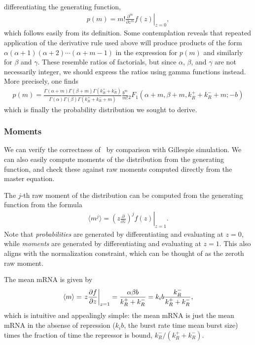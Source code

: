 differentiating the generating function,
\begin{align}
p(m) = m! \left.\frac{\partial^m}{\partial z^m} f(z) \right|_{z=0},
\end{align}
which follows easily from its definition. Some contemplation reveals
that repeated application of the derivative rule used above will produce
products of the form $\alpha(\alpha+1)(\alpha+2)\cdots(\alpha+m-1)$ in
the expression for $p(m)$ and similarly for $\beta$ and $\gamma$. These
resemble ratios of factorials, but since $\alpha$, $\beta$, and $\gamma$
are not necessarily integer, we should express the ratios using gamma
functions instead. More precisely, one finds
\begin{align}
p(m) = \frac{
        \Gamma(\alpha + m)\Gamma(\beta + m)\Gamma(k_R^+ + k_R^-)
        }
        {
        \Gamma(\alpha)\Gamma(\beta)\Gamma(k_R^+ + k_R^- + m)
        }
\frac{b^m}{m!}{_2F_1}(\alpha+m, \beta+m, k_R^++k_R^-+m; -b)
\label{eq:p_m_bursty+rep_appdx}
\end{align}
which is finally the probability distribution we sought to derive.

\subsubsection{Moments}
We can verify the correctness of~
by comparison with Gillespie simulation.
We can also easily compute moments of the distribution from
the generating function, and check these against raw moments computed
directly from the master equation.

The $j$-th raw moment of the distribution can be computed from the
generating function from the formula
\begin{align}
\langle m^j \rangle
= \left. \left(z \frac{\partial}{\partial z}\right)^j f(z)\right|_{z=1}.
\end{align}
Note that \textit{probabilities} are generated by differentiating
and evaluating at $z=0$, while \textit{moments} are generated by
differentiating and evaluating at $z=1$. This also aligns with the
normalization constraint, which can be thought of as the zeroth raw moment.
        
The mean mRNA is given by
\begin{align}
\langle m \rangle = \left.z \pderiv[f]{z} \right|_{z=1}
= \frac{\alpha\beta b}{k_R^+ + k_R^-}
= k_i b\frac{k_R^-}{k_R^+ + k_R^-},
\end{align}
which is intuitive and appealingly simple:
the mean mRNA is just the mean mRNA in the absense of repression
($k_i b$, the burst rate time mean burst size)
times the fraction of time the repressor is bound, $k_R^-/(k_R^+ + k_R^-)$.


